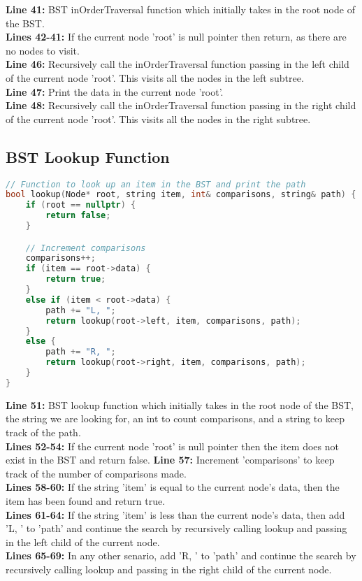 \documentclass[letterpaper, 10pt,DIV=13]{scrartcl}
\numberwithin{equation}{section} %
\numberwithin{figure}{section} %
\numberwithin{table}{section} %
\begin{document}
\textbf{Line 41:} BST inOrderTraversal function which initially takes in the root node of the BST. \\
\textbf{Lines 42-41:} If the current node 'root' is null pointer then return, as there are no nodes to visit. \\
\textbf{Line 46:} Recursively call the inOrderTraversal function passing in the left child of the current node 'root'. This visits all the nodes in the left subtree. \\
\textbf{Line 47:} Print the data in the current node 'root'. \\
\textbf{Line 48:} Recursively call the inOrderTraversal function passing in the right child of the current node 'root'. This visits all the nodes in the right subtree. \\

\subsection{BST Lookup Function}
\begin{linenumbers}
\begin{lstlisting}[language=C++, caption={BST Lookup Function}, label={code:example}]
// Function to look up an item in the BST and print the path
bool lookup(Node* root, string item, int& comparisons, string& path) {
    if (root == nullptr) {
        return false;
    }

    // Increment comparisons
    comparisons++;
    if (item == root->data) {
        return true;
    }
    else if (item < root->data) {
        path += "L, ";
        return lookup(root->left, item, comparisons, path);
    }
    else {
        path += "R, ";
        return lookup(root->right, item, comparisons, path);
    }
}
\end{lstlisting}
\end{linenumbers}
\nolinenumbers

\textbf{Line 51:} BST lookup function which initially takes in the root node of the BST, the string we are looking for, an int to count comparisons, and a string to keep track of the path. \\
\textbf{Lines 52-54:}  If the current node 'root' is null pointer then the item does not exist in the BST and return false.
\textbf{Line 57:} Increment 'comparisons' to keep track of the number of comparisons made. \\
\textbf{Lines 58-60:}  If the string 'item' is equal to the current node's data, then the item has been found and return true. \\
\textbf{Lines 61-64:}  If the string 'item' is less than the current node's data, then add 'L, ' to 'path' and continue the search by recursively calling lookup and passing in the left child of the current node. \\
\textbf{Lines 65-69:}  In any other senario, add 'R, ' to 'path' and continue the search by recursively calling lookup and passing in the right child of the current node. \\
\end{document}

